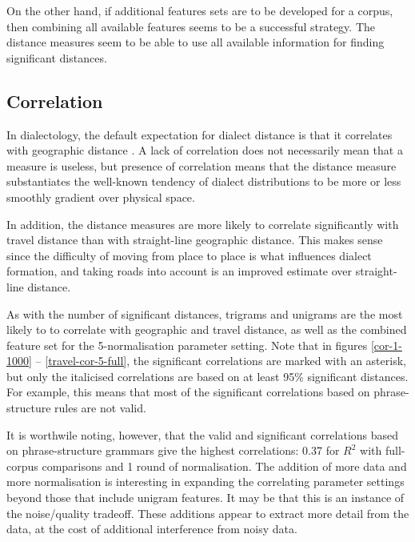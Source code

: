 On the other hand, if additional features sets are to be developed for
a corpus, then combining all available features seems to be a
successful strategy. The distance measures seem to be able to use all
available information for finding significant distances.

\subsection{Correlation}

In dialectology, the default expectation for dialect distance is that
it correlates with geographic distance \cite{chambers98}. A lack of
correlation does not necessarily mean that a measure is useless, but
presence of correlation means that the distance measure substantiates the
well-known tendency of dialect distributions to be more or less
smoothly gradient over physical space.

In addition, the distance measures are more likely to correlate
significantly with travel distance than with straight-line geographic
distance. This makes sense since the difficulty of moving from place
to place is what influences dialect formation, and taking roads into
account is an improved estimate over straight-line distance.

As with the number of significant distances, trigrams and unigrams are
the most likely to to correlate with geographic and travel distance,
as well as the combined feature set for the 5-normalisation parameter
setting.
Note that in figures \ref{cor-1-1000} --
\ref{travel-cor-5-full}, the significant correlations are marked with
an asterisk, but only the italicised correlations are based on at
least 95\% significant distances. For example, this means that most of
the significant correlations based on phrase-structure rules are not valid.

It is worthwile noting, however, that the valid and significant
correlations based on phrase-structure grammars give the highest
correlations: 0.37 for $R^2$ with full-corpus comparisons and 1 round
of normalisation.
The addition of more data and more normalisation is interesting in
expanding the correlating parameter settings beyond those that include
unigram features. It may be that this is an instance of the noise/quality tradeoff.
These additions appear to extract more detail from
the data, at the cost of additional interference from noisy data.

